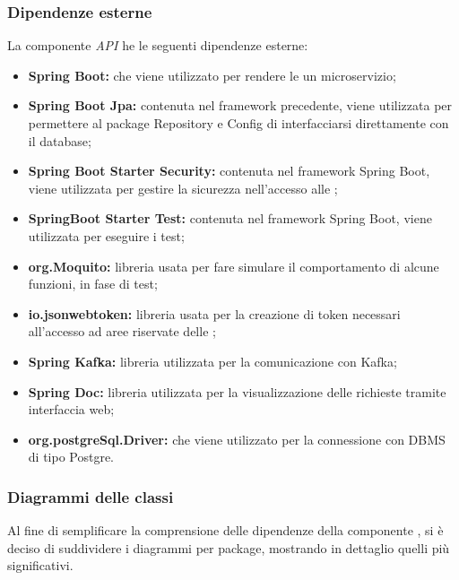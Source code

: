 	\subsubsection{Dipendenze esterne}
		La componente \textit{API} he le seguenti dipendenze esterne:
		\begin{itemize}
			\item \textbf{Spring Boot:} che viene utilizzato per rendere le  un microservizio; 
			\item \textbf{Spring Boot Jpa:} contenuta nel framework precedente, viene utilizzata per permettere al package Repository e Config di interfacciarsi direttamente con il database;
			\item \textbf{Spring Boot Starter Security:} contenuta nel framework Spring Boot, viene utilizzata per gestire la sicurezza nell'accesso alle ;
			\item \textbf{SpringBoot Starter Test:} contenuta nel framework Spring Boot, viene utilizzata per eseguire i test;
			\item \textbf{org.Moquito:} libreria usata per fare simulare il comportamento di alcune funzioni, in fase di test;
			\item \textbf{io.jsonwebtoken:} libreria usata per la creazione di token necessari all'accesso ad aree riservate delle ;
			\item \textbf{Spring Kafka:} libreria utilizzata per la comunicazione con Kafka;
			\item \textbf{Spring Doc:} libreria utilizzata per la visualizzazione delle richieste  tramite interfaccia web;
			\item \textbf{org.postgreSql.Driver:} che viene utilizzato per la connessione con DBMS di tipo Postgre.
		\end{itemize}

	\subsubsection{Diagrammi delle classi}
		Al fine di semplificare la comprensione delle dipendenze della componente , si è deciso di suddividere i diagrammi per package, mostrando in dettaglio quelli più significativi.

